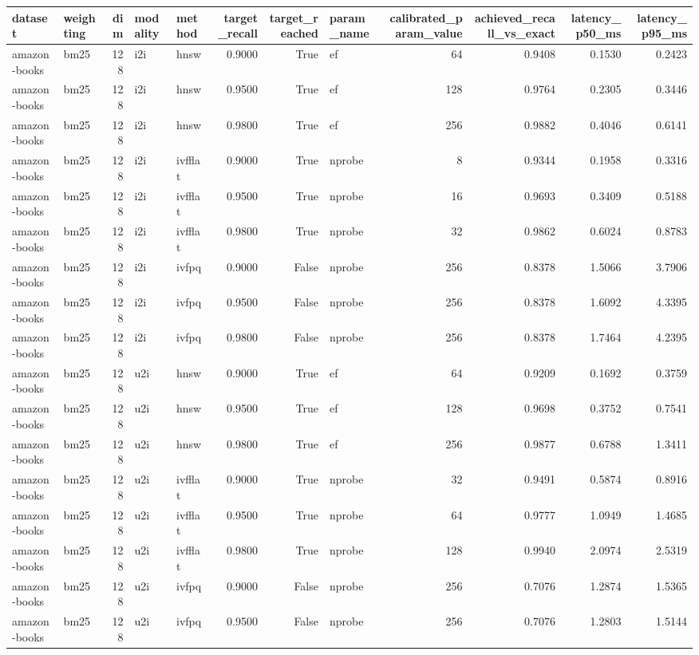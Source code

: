 \begin{tabular}{llrllrrlrrrr}
\toprule
dataset & weighting & dim & modality & method & target_recall & target_reached & param_name & calibrated_param_value & achieved_recall_vs_exact & latency_p50_ms & latency_p95_ms \\
\midrule
amazon-books & bm25 & 128 & i2i & hnsw & 0.9000 & True & ef & 64 & 0.9408 & 0.1530 & 0.2423 \\
amazon-books & bm25 & 128 & i2i & hnsw & 0.9500 & True & ef & 128 & 0.9764 & 0.2305 & 0.3446 \\
amazon-books & bm25 & 128 & i2i & hnsw & 0.9800 & True & ef & 256 & 0.9882 & 0.4046 & 0.6141 \\
amazon-books & bm25 & 128 & i2i & ivfflat & 0.9000 & True & nprobe & 8 & 0.9344 & 0.1958 & 0.3316 \\
amazon-books & bm25 & 128 & i2i & ivfflat & 0.9500 & True & nprobe & 16 & 0.9693 & 0.3409 & 0.5188 \\
amazon-books & bm25 & 128 & i2i & ivfflat & 0.9800 & True & nprobe & 32 & 0.9862 & 0.6024 & 0.8783 \\
amazon-books & bm25 & 128 & i2i & ivfpq & 0.9000 & False & nprobe & 256 & 0.8378 & 1.5066 & 3.7906 \\
amazon-books & bm25 & 128 & i2i & ivfpq & 0.9500 & False & nprobe & 256 & 0.8378 & 1.6092 & 4.3395 \\
amazon-books & bm25 & 128 & i2i & ivfpq & 0.9800 & False & nprobe & 256 & 0.8378 & 1.7464 & 4.2395 \\
amazon-books & bm25 & 128 & u2i & hnsw & 0.9000 & True & ef & 64 & 0.9209 & 0.1692 & 0.3759 \\
amazon-books & bm25 & 128 & u2i & hnsw & 0.9500 & True & ef & 128 & 0.9698 & 0.3752 & 0.7541 \\
amazon-books & bm25 & 128 & u2i & hnsw & 0.9800 & True & ef & 256 & 0.9877 & 0.6788 & 1.3411 \\
amazon-books & bm25 & 128 & u2i & ivfflat & 0.9000 & True & nprobe & 32 & 0.9491 & 0.5874 & 0.8916 \\
amazon-books & bm25 & 128 & u2i & ivfflat & 0.9500 & True & nprobe & 64 & 0.9777 & 1.0949 & 1.4685 \\
amazon-books & bm25 & 128 & u2i & ivfflat & 0.9800 & True & nprobe & 128 & 0.9940 & 2.0974 & 2.5319 \\
amazon-books & bm25 & 128 & u2i & ivfpq & 0.9000 & False & nprobe & 256 & 0.7076 & 1.2874 & 1.5365 \\
amazon-books & bm25 & 128 & u2i & ivfpq & 0.9500 & False & nprobe & 256 & 0.7076 & 1.2803 & 1.5144 \\

\end{tabular}
